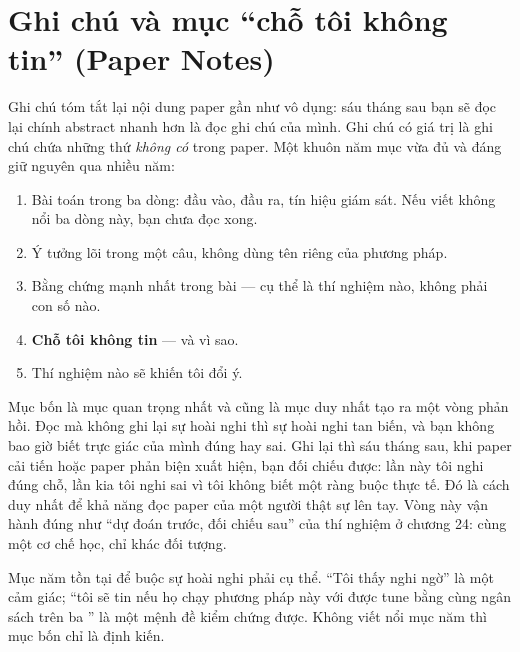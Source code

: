 \documentclass[../../deep_learning.tex]{subfiles}
\begin{document}
\section{Ghi chú và mục ``chỗ tôi không tin'' (Paper Notes)}
Ghi chú tóm tắt lại nội dung paper gần như vô dụng: sáu tháng sau bạn sẽ đọc lại chính abstract nhanh hơn là đọc ghi chú của mình. Ghi chú có giá trị là ghi chú chứa những thứ \emph{không có} trong paper. Một khuôn năm mục vừa đủ và đáng giữ nguyên qua nhiều năm:

\begin{enumerate}
\item Bài toán trong ba dòng: đầu vào, đầu ra, tín hiệu giám sát. Nếu viết không nổi ba dòng này, bạn chưa đọc xong.
\item Ý tưởng lõi trong một câu, không dùng tên riêng của phương pháp.
\item Bằng chứng mạnh nhất trong bài — cụ thể là thí nghiệm nào, không phải con số nào.
\item \textbf{Chỗ tôi không tin} — và vì sao.
\item Thí nghiệm nào sẽ khiến tôi đổi ý.
\end{enumerate}

Mục bốn là mục quan trọng nhất và cũng là mục duy nhất tạo ra một vòng phản hồi. Đọc mà không ghi lại sự hoài nghi thì sự hoài nghi tan biến, và bạn không bao giờ biết trực giác của mình đúng hay sai. Ghi lại thì sáu tháng sau, khi paper cải tiến hoặc paper phản biện xuất hiện, bạn đối chiếu được: lần này tôi nghi đúng chỗ, lần kia tôi nghi sai vì tôi không biết một ràng buộc thực tế. Đó là cách duy nhất để khả năng đọc paper của một người thật sự lên tay. Vòng này vận hành đúng như ``dự đoán trước, đối chiếu sau'' của thí nghiệm ở chương 24: cùng một cơ chế học, chỉ khác đối tượng.

Mục năm tồn tại để buộc sự hoài nghi phải cụ thể. ``Tôi thấy nghi ngờ'' là một cảm giác; ``tôi sẽ tin nếu họ chạy phương pháp này với  được tune bằng cùng ngân sách trên ba '' là một mệnh đề kiểm chứng được. Không viết nổi mục năm thì mục bốn chỉ là định kiến.
\end{document}
